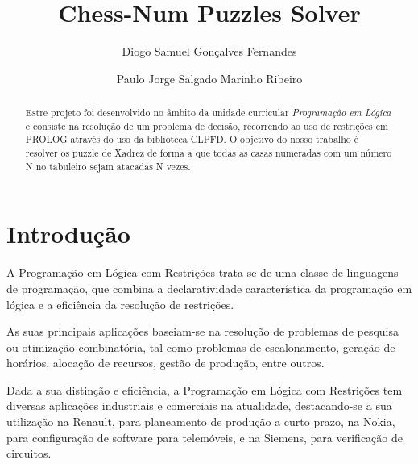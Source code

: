 \documentclass[runningheads]{llncs}
\begin{document}
%
\title{Chess-Num Puzzles Solver}
\author{Diogo Samuel Gonçalves Fernandes \and
Paulo Jorge Salgado Marinho Ribeiro}

%
\maketitle
\begin{abstract}
Estre projeto foi desenvolvido no âmbito da unidade curricular \emph{Programação em Lógica} e consiste na resolução de um problema
de decisão, recorrendo ao uso de restrições em PROLOG através do uso da biblioteca CLPFD. O objetivo do nosso trabalho é resolver
os puzzle de Xadrez de forma a que todas as casas numeradas com um número N no tabuleiro sejam atacadas N vezes.

\end{abstract}

\section{Introdução}
A Programação em Lógica com Restrições trata-se de uma classe de linguagens de programação, que combina a declaratividade característica da programação em lógica
e a eficiência da resolução de restrições. 

As suas principais aplicações baseiam-se na resolução de problemas de pesquisa ou otimização combinatória, 
tal como problemas de escalonamento, geração de horários, alocação de recursos, gestão de produção, entre outros.

Dada a sua distinção e eficiência, a Programação em Lógica com Restrições tem diversas aplicações industriais e comerciais na atualidade, 
destacando-se a sua utilização na Renault, para planeamento de produção a curto prazo, na Nokia, para configuração de software para telemóveis, 
e na Siemens, para verificação de circuitos.
\end{document}
